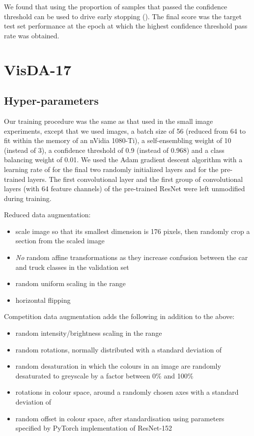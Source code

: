 \documentclass{article}
\begin{document}
We found that using the proportion of samples that passed the confidence threshold can be used to drive early stopping (\cite{Prechelt:EarlyStopping}). The final score was the target test set performance at the epoch at which the highest confidence threshold pass rate was obtained.





\section{VisDA-17}
\label{app:visda}

\subsection{Hyper-parameters}
\label{app:visda:hyperparams}

Our training procedure was the same as that used in the small image experiments, except that we used  images, a batch size of 56 (reduced from 64 to fit within the memory of an nVidia 1080-Ti), a self-ensembling weight of 10 (instead of 3), a confidence threshold of 0.9 (instead of 0.968) and a class balancing weight of 0.01. We used the Adam \cite{Kingma:Adam} gradient descent algorithm with a learning rate of  for the final two randomly initialized layers and  for the pre-trained layers. The first convolutional layer and the first group of convolutional layers (with 64 feature channels) of the pre-trained ResNet were left unmodified during training.

Reduced data augmentation:
\begin{itemize}
  \item scale image so that its smallest dimension is 176 pixels, then randomly crop a  section from the scaled image
  \item \emph{No} random affine transformations as they increase confusion between the car and truck classes in the validation set
  \item random uniform scaling in the range 
  \item horizontal flipping
\end{itemize}

Competition data augmentation adds the following in addition to the above:
\begin{itemize}
  \item random intensity/brightness scaling in the range 
  \item random rotations, normally distributed with a standard deviation of 
  \item random desaturation in which the colours in an image are randomly desaturated to greyscale by a factor between 0\% and 100\%
  \item rotations in colour space, around a randomly chosen axes with a standard deviation of 
  \item random offset in colour space, after standardisation using parameters specified by PyTorch implementation of ResNet-152
\end{itemize}
\end{document}

